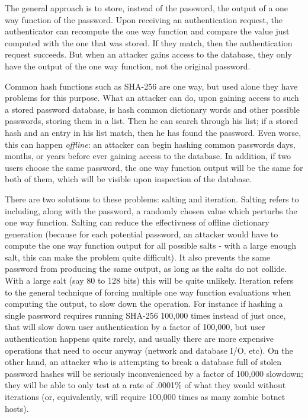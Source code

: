 \documentclass{article}
\begin{document}
The general approach is to store, instead of the password, the output
of a one way function of the password. Upon receiving an
authentication request, the authenticator can recompute the one way
function and compare the value just computed with the one that was
stored. If they match, then the authentication request succeeds. But
when an attacker gains access to the database, they only have the
output of the one way function, not the original password.

Common hash functions such as SHA-256 are one way, but used alone they
have problems for this purpose. What an attacker can do, upon gaining
access to such a stored password database, is hash common dictionary
words and other possible passwords, storing them in a list. Then he
can search through his list; if a stored hash and an entry in his list
match, then he has found the password. Even worse, this can happen
\emph{offline}: an attacker can begin hashing common passwords days,
months, or years before ever gaining access to the database. In
addition, if two users choose the same password, the one way function
output will be the same for both of them, which will be visible upon
inspection of the database.

There are two solutions to these problems: salting and
iteration. Salting refers to including, along with the password, a
randomly chosen value which perturbs the one way function. Salting can
reduce the effectivness of offline dictionary generation (because for
each potential password, an attacker would have to compute the one way
function output for all possible salts - with a large enough salt,
this can make the problem quite difficult). It also prevents the same
password from producing the same output, as long as the salts do not
collide. With a large salt (say 80 to 128 bits) this will be quite
unlikely. Iteration refers to the general technique of forcing
multiple one way function evaluations when computing the output, to
slow down the operation. For instance if hashing a single password
requires running SHA-256 100,000 times instead of just once, that will
slow down user authentication by a factor of 100,000, but user
authentication happens quite rarely, and usually there are more
expensive operations that need to occur anyway (network and database
I/O, etc). On the other hand, an attacker who is attempting to break a
database full of stolen password hashes will be seriously
inconvenienced by a factor of 100,000 slowdown; they will be able to
only test at a rate of .0001\% of what they would without iterations
(or, equivalently, will require 100,000 times as many zombie botnet
hosts).
\end{document}
